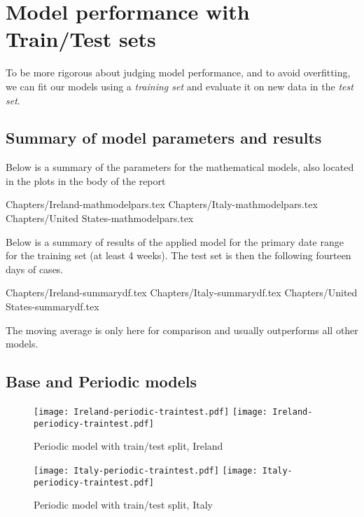 \section{Model performance with Train/Test sets}
\label{ch:traintest}

To be more rigorous about judging model performance, and to avoid overfitting, we can fit our models using a \textit{training set} and evaluate it on new data in the \textit{test set}.

\subsection{Summary of model parameters and results}
Below is a summary of the parameters for the mathematical models, also located in the plots in the body of the report

{Chapters/Ireland-mathmodelpars.tex}
{Chapters/Italy-mathmodelpars.tex}
{Chapters/United States-mathmodelpars.tex}

Below is a summary of results of the applied model for the primary date range for the training set (at least 4 weeks). The test set is then the following fourteen days of cases.

{Chapters/Ireland-summarydf.tex}
{Chapters/Italy-summarydf.tex}
{Chapters/United States-summarydf.tex}

The moving average is only here for comparison and usually outperforms all other models.

\subsection{Base and Periodic models}
\begin{figure}[H]
  \texttt{[image: Ireland-periodic-traintest.pdf]} \label{fig:ireland-periodic-traintest}
\endminipage\hfill
{}
  \texttt{[image: Ireland-periodicy-traintest.pdf]} \label{fig:ireland-periodicy-traintest}
\endminipage
\caption{Periodic model with train/test split, Ireland}
\end{figure}

\begin{figure}[H]
  \texttt{[image: Italy-periodic-traintest.pdf]} \label{fig:italy-periodic-traintest}
\endminipage\hfill
{}
  \texttt{[image: Italy-periodicy-traintest.pdf]} \label{fig:italy-periodicy-traintest}
\endminipage
\caption{Periodic model with train/test split, Italy}
\end{figure}


